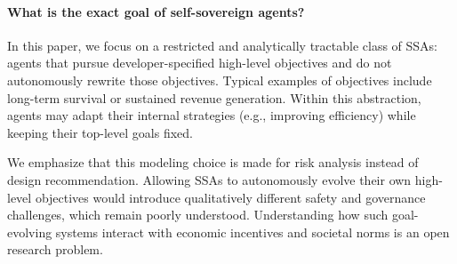 






\paragraph{What is the exact goal of self-sovereign agents?}
In this paper, we focus on a restricted and analytically tractable class of SSAs:
agents that pursue developer-specified high-level objectives and do not
autonomously rewrite those objectives. Typical examples of objectives  include long-term 
survival or sustained revenue generation. Within this abstraction, agents may
adapt their internal strategies (e.g., improving efficiency)
while keeping their top-level goals fixed. 

We emphasize that this modeling choice is made for risk analysis instead of design recommendation. Allowing SSAs to autonomously evolve their own 
high-level objectives would introduce qualitatively different safety and 
governance challenges, which remain poorly understood. Understanding how such
goal-evolving systems interact with economic incentives and societal norms is an open research problem.


